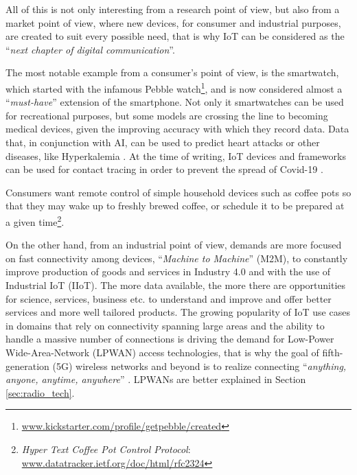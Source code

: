 			All of this is not only interesting from a research point of view, but also from a market point of view, where new devices, for consumer and industrial purposes, are created to suit every possible need, that is why IoT can be considered as the ``\textit{next chapter of digital communication}''.
			
			The most notable example from a consumer's point of view, is the smartwatch, which started with the infamous Pebble watch\footnote{ \url{www.kickstarter.com/profile/getpebble/created}}, and is now considered almost a ``\textit{must-have}'' extension of the smartphone.
			Not only it smartwatches can be used for recreational purposes, but some models are crossing the line to becoming medical devices, given the improving accuracy with which they record data.
			Data that, in conjunction with AI, can be used to predict heart attacks \cite{7946780} or other diseases, like Hyperkalemia \cite{HYPERKALEMIA}.
			At the time of writing, IoT devices and frameworks can be used for contact tracing in order to prevent the spread of Covid-19 \cite{9181512}.
			
			Consumers want remote control of simple household devices such as coffee pots so that they may wake up to freshly	brewed coffee, or schedule it to be prepared at a given time\footnote{ \textit{Hyper Text Coffee Pot Control Protocol}: \url{www.datatracker.ietf.org/doc/html/rfc2324}}.
			
			On the other hand, from an industrial point of view, demands are more focused on fast connectivity among devices, ``\textit{Machine to Machine}'' (M2M), to constantly improve production of goods and services in Industry 4.0 and with the use of Industrial IoT (IIoT).
			The more data available, the more there are opportunities for science, services, business etc. to understand and improve and offer better services and more well tailored products.
			The growing popularity of IoT use cases in domains that rely on connectivity spanning large areas and the ability to handle a massive number of connections is driving the demand for Low-Power Wide-Area-Network (LPWAN) access technologies, that is why the goal of fifth-generation (5G) wireless networks and beyond is to realize connecting ``\textit{anything, anyone, anytime, anywhere}'' \cite{7414384}.
			LPWANs are better explained in Section \ref{sec:radio_tech}.
			
